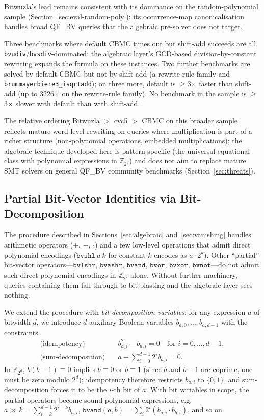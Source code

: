 \documentclass[runningheads]{llncs}
\newcommand{\cbmc}{\textsc{CBMC}\xspace}
\begin{document}
Bitwuzla's lead remains consistent with its dominance on
the random-polynomial sample (Section~\ref{sec:eval-random-poly}):
its occurrence-map canonicalisation handles broad QF\_BV
queries that the algebraic pre-solver does not target.

Three benchmarks where default \cbmc times out but shift-add
succeeds are all \texttt{bvudiv}/\texttt{bvsdiv}-dominated: the
algebraic layer's GCD-based division-by-constant rewriting
expands the formula on these instances. Two further benchmarks
are solved by default \cbmc but not by shift-add (a rewrite-rule
family and \texttt{brummayerbiere3\_isqrtadd}); on three more,
default is ${\geq}$3$\times$ faster than shift-add (up to
3226$\times$ on the rewrite-rule family). No benchmark in the
sample is ${\geq}$3$\times$ slower with default than with
shift-add.

The relative ordering Bitwuzla $>$ cvc5 $>$ \cbmc on this
broader sample reflects mature word-level rewriting on queries
where multiplication is part of a richer structure
(non-polynomial operations, embedded multiplications); the
algebraic technique developed here is pattern-specific (the
universal-equational class with polynomial expressions in
$\mathbb{Z}_{2^d}$) and does not aim to replace mature SMT
solvers on general QF\_BV community
benchmarks (Section~\ref{sec:threats}).

\subsection{Partial Bit-Vector Identities via Bit-Decomposition}
\label{sec:eval-pbv}

The procedure described in Sections~\ref{sec:algebraic}
and~\ref{sec:vanishing} handles arithmetic operators
($+$, $-$, $\cdot$) and a few low-level operations that admit
direct polynomial encodings ($\mathtt{bvshl}\ a\ k$ for constant
$k$ encodes as $a \cdot 2^k$). Other ``partial'' bit-vector
operators---$\mathtt{bvlshr}$, $\mathtt{bvashr}$,
$\mathtt{bvand}$, $\mathtt{bvor}$, $\mathtt{bvxor}$,
$\mathtt{bvnot}$---do not admit such direct polynomial
encodings in $\mathbb{Z}_{2^d}$ alone. Without further
machinery, queries containing them fall through to bit-blasting
and the algebraic layer sees nothing.

We extend the procedure with \emph{bit-decomposition variables}:
for any expression $a$ of bitwidth $d$, we introduce $d$
auxiliary Boolean variables $b_{a,0}, \ldots, b_{a,d-1}$ with the
constraints
\begin{align*}
\text{(idempotency)} \quad & b_{a,i}^2 - b_{a,i} = 0
  \quad \text{for } i = 0, \ldots, d-1, \\
\text{(sum-decomposition)} \quad & a - \sum_{i=0}^{d-1} 2^i b_{a,i} = 0.
\end{align*}
In $\mathbb{Z}_{2^d}$, $b(b-1) \equiv 0$ implies $b \equiv 0$ or
$b \equiv 1$ (since $b$ and $b-1$ are coprime, one must be zero
modulo $2^d$); idempotency therefore restricts $b_{a,i}$ to
$\{0, 1\}$, and sum-decomposition forces it to be the $i$-th bit
of $a$. With bit variables in scope, the partial operators become
sound polynomial expressions, e.g.\
$a \gg k = \sum_{i=k}^{d-1} 2^{i-k} b_{a,i}$,
$\mathtt{bvand}(a, b) = \sum_i 2^i (b_{a,i} \cdot b_{b,i})$,
and so on.
\end{document}
